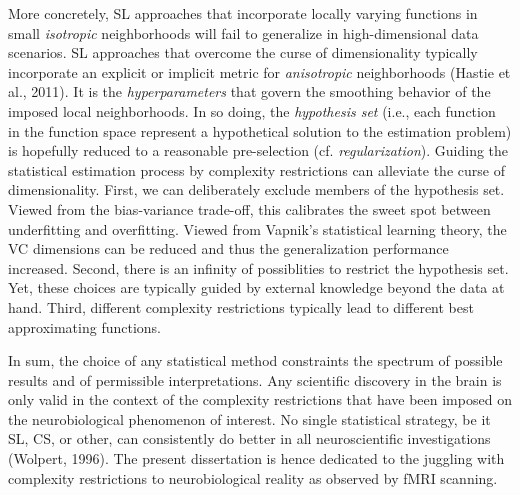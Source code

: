 \documentclass[authoryear,review,3p]{elsarticle}
\begin{document}
More concretely,
SL approaches that incorporate locally varying functions
in small \textit{isotropic} neighborhoods
will fail to generalize in high-dimensional data scenarios.
SL approaches that overcome the curse of dimensionality typically
incorporate an explicit or implicit metric for
\textit{anisotropic} neighborhoods
(Hastie et al., 2011).
%
It is the \textit{hyperparameters} that govern the
smoothing behavior of the imposed local neighborhoods.
%
In so doing,
the \textit{hypothesis set} (i.e., each function in the function space
represent a hypothetical solution to
the estimation problem) is hopefully reduced to
a reasonable pre-selection (cf. \textit{regularization}).
%
Guiding the statistical estimation process by
complexity restrictions can alleviate the curse of dimensionality.
First,
we can deliberately exclude members of the hypothesis set.
Viewed from the bias-variance trade-off, this calibrates
the sweet spot between underfitting and overfitting.
Viewed from Vapnik's statistical learning theory,
the VC dimensions can be reduced and thus the generalization performance
increased.
%
Second, there is an infinity of possiblities to restrict the hypothesis set.
Yet, these choices are typically guided by external knowledge beyond
the data at hand.
%
Third,
different complexity restrictions typically lead to different
best approximating functions.


In sum,
the choice of any statistical method constraints
the spectrum of possible results and of permissible interpretations.
Any scientific discovery in the brain is only valid in the
context of the complexity restrictions that have been imposed
on the neurobiological phenomenon of interest.
%
No single statistical strategy, be it SL, CS, or other,
can consistently
do better in all neuroscientific investigations
(Wolpert, 1996).
%
The present dissertation
is hence dedicated to the juggling with
complexity restrictions to
neurobiological reality as observed by fMRI scanning.
\end{document}
